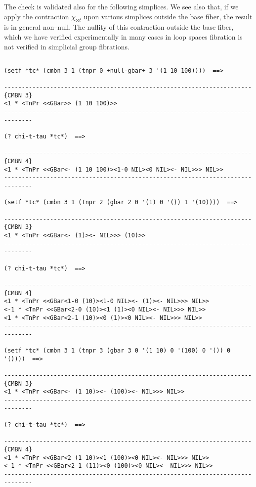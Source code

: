The check is validated also for the following simplices. We see also that,
if we apply the contraction $\chi_{\otimes t}$ upon various simplices outside the base fiber, the
result is in general non--null. The nullity of this contraction  outside
the base fiber, which we have verified experimentally in many cases in  loop spaces fibration
is not verified in  simplicial group fibrations.
{\footnotesize\begin{verbatim}

(setf *tc* (cmbn 3 1 (tnpr 0 +null-gbar+ 3 '(1 10 100))))  ==>

----------------------------------------------------------------------{CMBN 3}
<1 * <TnPr <<GBar>> (1 10 100)>>
------------------------------------------------------------------------------

(? chi-t-tau *tc*)  ==>

----------------------------------------------------------------------{CMBN 4}
<1 * <TnPr <<GBar<- (1 10 100)><1-0 NIL><0 NIL><- NIL>>> NIL>>
------------------------------------------------------------------------------

(setf *tc* (cmbn 3 1 (tnpr 2 (gbar 2 0 '(1) 0 '()) 1 '(10))))  ==>

----------------------------------------------------------------------{CMBN 3}
<1 * <TnPr <<GBar<- (1)><- NIL>>> (10)>>
------------------------------------------------------------------------------

(? chi-t-tau *tc*)  ==>

----------------------------------------------------------------------{CMBN 4}
<1 * <TnPr <<GBar<1-0 (10)><1-0 NIL><- (1)><- NIL>>> NIL>>
<-1 * <TnPr <<GBar<2-0 (10)><1 (1)><0 NIL><- NIL>>> NIL>>
<1 * <TnPr <<GBar<2-1 (10)><0 (1)><0 NIL><- NIL>>> NIL>>
------------------------------------------------------------------------------

(setf *tc* (cmbn 3 1 (tnpr 3 (gbar 3 0 '(1 10) 0 '(100) 0 '()) 0 '())))  ==>

----------------------------------------------------------------------{CMBN 3}
<1 * <TnPr <<GBar<- (1 10)><- (100)><- NIL>>> NIL>>
------------------------------------------------------------------------------

(? chi-t-tau *tc*)  ==>

----------------------------------------------------------------------{CMBN 4}
<1 * <TnPr <<GBar<2 (1 10)><1 (100)><0 NIL><- NIL>>> NIL>>
<-1 * <TnPr <<GBar<2-1 (11)><0 (100)><0 NIL><- NIL>>> NIL>>
------------------------------------------------------------------------------


\end{verbatim}}
